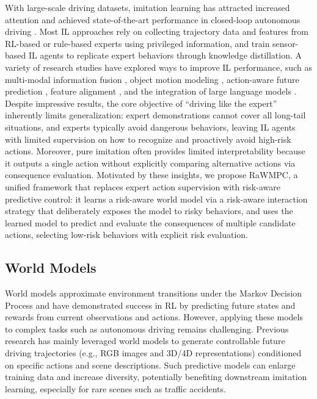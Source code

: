 \documentclass[twocolumn]{template}
\theoremstyle{thmstyleone}%
\theoremstyle{thmstyletwo}%
\theoremstyle{thmstylethree}%
\begin{document}
With large-scale driving datasets, imitation learning has attracted increased attention and achieved state-of-the-art performance in closed-loop autonomous driving \cite{Simlingo,Goalflow,Hip_ad,HydraNeXt}. Most IL approaches rely on collecting trajectory data and features from RL-based \cite{Roach,Think2drive} or rule-based \cite{Transfuser,Drivelm} experts using privileged information, and train sensor-based IL agents to replicate expert behaviors through knowledge distillation. 
A variety of research studies have explored ways to improve IL performance, such as multi-modal information fusion \cite{Transfuser,TransFuser++,Transfuser_conf}, object motion modeling \cite{Reasonnet,PlanT,InterFuser,Drivetransformer}, action-aware future prediction \cite{MILE,ThinkTwice,LAW,WoTE}, feature alignment \cite{Driveadapter,CaT}, and the integration of large language models \cite{Drivelm,Lmdrive,Drivegpt4,Rag,CarLLaVA,Lingoqa,Simlingo,Orion}.
Despite impressive results, the core objective of ``driving like the expert'' inherently limits generalization: expert demonstrations cannot cover all long-tail situations, and experts typically avoid dangerous behaviors, leaving IL agents with limited supervision on how to recognize and proactively avoid high-risk actions. 
Moreover, pure imitation often provides limited interpretability because it outputs a single action without explicitly comparing alternative actions via consequence evaluation. 
Motivated by these insights, we propose RaWMPC, a unified framework that replaces expert action supervision with risk-aware predictive control: it learns a risk-aware world model via a risk-aware interaction strategy that deliberately exposes the model to risky behaviors, and uses the learned model to predict and evaluate the consequences of multiple candidate actions, selecting low-risk behaviors with explicit risk evaluation. 

\subsection{World Models}

World models approximate environment transitions under the Markov Decision Process and have demonstrated success in RL \cite{RLWM1,RLWM2,RLWM4,RLWM5,RLWM6,RLWM7,RLWM9,RLWM10,MaRLn} by predicting future states and rewards from current observations and actions.
However, applying these models to complex tasks such as autonomous driving remains challenging.
Previous research \cite{Gaia1,Vista,WM1,WM2,WM3,WM4,WM5,WM6,WM7,WM8,WM9,WM10,DriveDreamer4D,ReconDreamer,MaskGWM,GaussianWorld} has mainly leveraged world models to generate controllable future driving trajectories (e.g., RGB images and 3D/4D representations) conditioned on specific actions and scene descriptions. 
Such predictive models can enlarge training data and increase diversity, potentially benefiting downstream imitation learning, especially for rare scenes such as traffic accidents.
\end{document}
